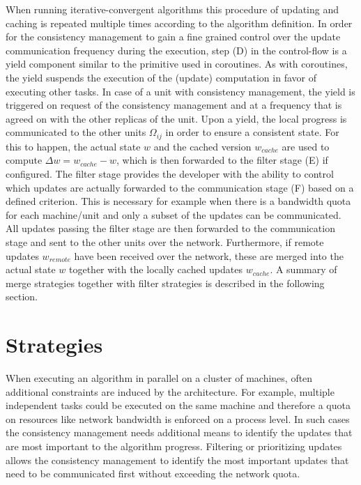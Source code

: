When running iterative-convergent algorithms this procedure of updating and caching is repeated multiple times according to the algorithm definition.
In order for the consistency management to gain a fine grained control over the update communication frequency during the execution, step (D) in the control-flow is a yield component similar to the primitive used in coroutines.
As with coroutines, the yield suspends the execution of the (update) computation in favor of executing other tasks.
In case of a unit with consistency management, the yield is triggered on request of the consistency management and at a frequency that is agreed on with the other replicas of the unit.
Upon a yield, the local progress is communicated to the other units $\Omega_{ij}$ in order to ensure a consistent state.
For this to happen, the actual state $w$ and the cached version $w_{cache}$ are used to compute $\Delta w = w_{cache} - w$, which is then forwarded to the filter stage (E) if configured.
The filter stage provides the developer with the ability to control which updates are actually forwarded to the communication stage (F) based on a defined criterion.
This is necessary for example when there is a bandwidth quota for each machine/unit and only a subset of the updates can be communicated.
All updates passing the filter stage are then forwarded to the communication stage and sent to the other units over the network.
Furthermore, if remote updates $w_{remote}$ have been received over the network, these are merged into the actual state $w$ together with the locally cached updates $w_{cache}$.
A summary of merge strategies together with filter strategies is described in the following section.


\section{Strategies}
When executing an algorithm in parallel on a cluster of machines, often additional constraints are induced by the architecture.
For example, multiple independent tasks could be executed on the same machine and therefore a quota on resources like network bandwidth is enforced on a process level.
In such cases the consistency management needs additional means to identify the updates that are most important to the algorithm progress.
Filtering or prioritizing updates allows the consistency management to identify the most important updates that need to be communicated first without exceeding the network quota.

